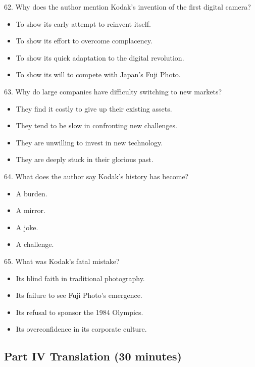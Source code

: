 \documentclass[UTF8,11pt]{ctexart}
\begin{document}
62. Why does the author mention Kodak’s invention of the first digital camera?


\begin{itemize}[leftmargin=2em,itemsep=.2em,topsep=.4em]\item[A.] To show its early attempt to reinvent itself.
\item[B.] To show its effort to overcome complacency.
\item[C.] To show its quick adaptation to the digital revolution.
\item[D.] To show its will to compete with Japan’s Fuji Photo.
\end{itemize}

63. Why do large companies have difficulty switching to new markets?


\begin{itemize}[leftmargin=2em,itemsep=.2em,topsep=.4em]\item[A.] They find it costly to give up their existing assets.
\item[B.] They tend to be slow in confronting new challenges.
\item[C.] They are unwilling to invest in new technology.
\item[D.] They are deeply stuck in their glorious past.
\end{itemize}

64. What does the author say Kodak’s history has become?


\begin{itemize}[leftmargin=2em,itemsep=.2em,topsep=.4em]\item[A.] A burden.
\item[B.] A mirror.
\item[C.] A joke.
\item[D.] A challenge.
\end{itemize}

65. What was Kodak’s fatal mistake?


\begin{itemize}[leftmargin=2em,itemsep=.2em,topsep=.4em]\item[A.] Its blind faith in traditional photography.
\item[B.] Its failure to see Fuji Photo’s emergence.
\item[C.] Its refusal to sponsor the 1984 Olympics.
\item[D.] Its overconfidence in its corporate culture.
\end{itemize}

\subsection*{\textbf{Part IV} \textbf{Translation} \textbf{(30 minutes)}}
\end{document}
